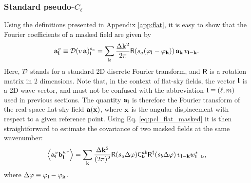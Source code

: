 \documentclass[usenatbib]{mnrasb}
\begin{document}
      \subsubsection{Standard pseudo-$C_\ell$}\label{sssec:maths.flat.pcl101}
        Using the definitions presented in Appendix \ref{app:flat}, it is easy to show that the Fourier coefficients of a masked field are given by
        \begin{equation}\label{eq:pcl_flat_masked}
          {\bf a}^v_{\bf l}\equiv{\cal D}(v\,{\bf a})^{s_a}_{\bf l}=\sum_{\bf k}\frac{\Delta {\bf k}^2}{2\pi}{\sf R}(s_a(\varphi_{\bf l}-\varphi_{\bf k}))\,{\bf a}_{\bf k}\,v_{{\bf l}-{\bf k}}.
        \end{equation}
        Here, ${\cal D}$ stands for a standard 2D discrete Fourier transform, and ${\sf R}$ is a rotation matrix in 2 dimensions.  Note that, in the context of flat-sky fields, the vector ${\bf l}$ is a 2D wave vector, and must not be confused with the abbreviation ${\bf l}\equiv(\ell,m)$ used in previous sections. The quantity ${\bf a}_{\bf l}$ is therefore the Fourier transform of the real-space flat-sky field ${\bf a}({\bf x})$, where ${\bf x}$ is the angular displacement with respect to a given reference point. Using Eq. \ref{eq:pcl_flat_masked} it is then straightforward to estimate the covariance of two masked fields at the same wavenumber:
        \begin{equation}\label{eq:flat_coup}
          \left\langle{\bf a}^v_{\bf l}{\bf b}^{w\dag}_{\bf l}\right\rangle=\sum_{\bf k}\frac{\Delta{\bf k}^2}{(2\pi)^2}{\sf R}(s_a\Delta\varphi){\sf C}^{ab}_{\bf k}{\sf R}^\dag(s_b\Delta\varphi)\,v_{{\bf l}-{\bf k}}w^*_{{\bf l}-{\bf k}},
        \end{equation}
        where $\Delta\varphi\equiv\varphi_{\bf l}-\varphi_{\bf k}$.
    
\end{document}
